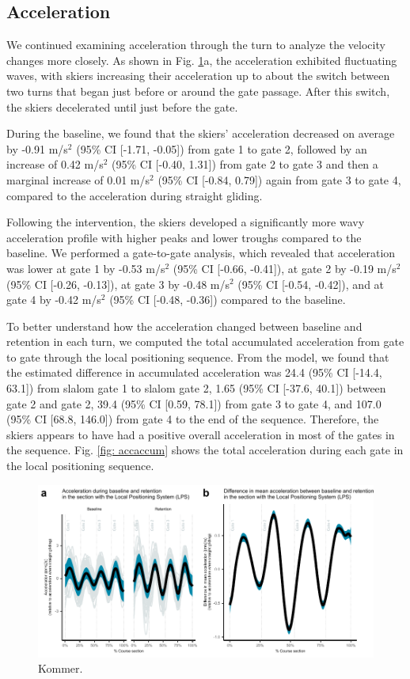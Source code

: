 \documentclass{article}
\begin{document}
\subsection{Acceleration}
We continued examining acceleration through the turn to analyze the velocity changes more closely. As shown in Fig. \ref{fig: acc}a, the acceleration exhibited fluctuating waves, with skiers increasing their acceleration up to about the switch between two turns that began just before or around the gate passage. After this switch, the skiers decelerated until just before the gate. 

During the baseline, we found that the skiers' acceleration decreased on average by -0.91 m/s$^2$ (95\% CI [-1.71, -0.05]) from gate 1 to gate 2, followed by an increase of 0.42 m/s$^2$ (95\% CI [-0.40, 1.31]) from gate 2 to gate 3 and then a marginal increase of 0.01 m/s$^2$ (95\% CI [-0.84, 0.79]) again from gate 3 to gate 4, compared to the acceleration during straight gliding.

Following the intervention, the skiers developed a significantly more wavy acceleration profile with higher peaks and lower troughs compared to the baseline. We performed a gate-to-gate analysis, which revealed that acceleration was lower at gate 1 by -0.53  m/s$^2$ (95\% CI [-0.66, -0.41]), at gate 2 by -0.19  m/s$^2$ (95\% CI [-0.26, -0.13]), at gate 3 by -0.48  m/s$^2$ (95\% CI [-0.54, -0.42]), and at gate 4 by -0.42  m/s$^2$  (95\% CI [-0.48, -0.36]) compared to the baseline. 

To better understand how the acceleration changed between baseline and retention in each turn, we computed the total accumulated acceleration from gate to gate through the local positioning sequence. From the model, we found that the estimated difference in accumulated acceleration was 24.4 (95\% CI [-14.4, 63.1]) from slalom gate 1 to slalom gate 2, 1.65 (95\% CI [-37.6, 40.1]) between gate 2 and gate 2, 39.4 (95\% CI [0.59, 78.1]) from gate 3 to gate 4, and 107.0 (95\% CI [68.8, 146.0]) from gate 4 to the end of the sequence. Therefore, the skiers appears to have had a positive overall acceleration in most of the gates in the sequence. Fig. \ref{fig: accaccum} shows the total acceleration during each gate in the local positioning sequence.
\begin{figure}[H]
\centering
\includegraphics{figurer/figure_acc.pdf}
\caption{Kommer.}\label{fig: acc}
\end{figure}
\end{document}
